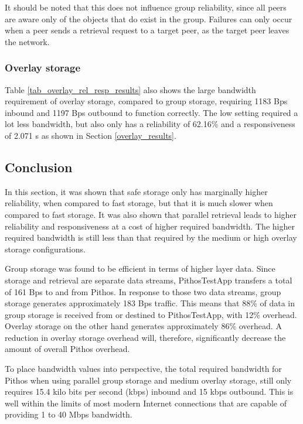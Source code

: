 It should be noted that this does not influence group reliability, since all peers are aware only of the objects that do exist in the group. Failures can only occur when a peer sends a retrieval request to a target peer, as the target peer leaves the network.

\subsubsection{Overlay storage}
Table \ref{tab_overlay_rel_resp_results} also shows the large bandwidth requirement of overlay storage, compared to group storage, requiring 1183 Bps inbound and 1197 Bps outbound to function correctly. The low setting required a lot less bandwidth, but also only has a reliability of 62.16\% and a responsiveness of 2.071 s as shown in Section \ref{overlay_results}.

\subsection{Conclusion}

In this section, it was shown that safe storage only has marginally higher reliability, when compared to fast storage, but that it is much slower when compared to fast storage. It was also shown that parallel retrieval leads to higher reliability and responsiveness at a cost of higher required bandwidth. The higher required bandwidth is still less than that required by the medium or high overlay storage configurations.

Group storage was found to be efficient in terms of higher layer data. Since storage and retrieval are separate data streams, PithosTestApp transfers a total of 161 Bps to and from Pithos. In response to those two data streams, group storage generates approximately 183 Bps traffic. This means that 88\% of data in group storage is received from or destined to PithosTestApp, with 12\% overhead. Overlay storage on the other hand generates approximately 86\% overhead. A reduction in overlay storage overhead will, therefore, significantly decrease the amount of overall Pithos overhead.

To place bandwidth values into perspective, the total required bandwidth for Pithos when using parallel group storage and medium overlay storage, still only requires 15.4 kilo bits per second (kbps) inbound and 15 kbps outbound. This is well within the limits of most modern Internet connections that are capable of providing 1 to 40 Mbps bandwidth.

